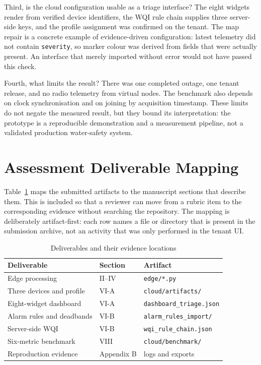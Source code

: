 \documentclass[conference]{IEEEtran}
\begin{document}
Third, is the cloud configuration usable as a triage interface? The eight
widgets render from verified device identifiers, the WQI rule chain supplies
three server-side keys, and the profile assignment was confirmed on the tenant.
The map repair is a concrete example of evidence-driven configuration: latest
telemetry did not contain \texttt{severity}, so marker colour was derived from
fields that were actually present. An interface that merely imported without
error would not have passed this check.

Fourth, what limits the result? There was one completed outage, one tenant
release, and no radio telemetry from virtual nodes. The benchmark also depends
on clock synchronisation and on joining by acquisition timestamp. These limits
do not negate the measured result, but they bound its interpretation: the
prototype is a reproducible demonstration and a measurement pipeline, not a
validated production water-safety system.

\section{Assessment Deliverable Mapping}
\label{sec:deliverables}

Table~\ref{tab:deliverables} maps the submitted artifacts to the manuscript
sections that describe them. This is included so that a reviewer can move from a
rubric item to the corresponding evidence without searching the repository. The
mapping is deliberately artifact-first: each row names a file or directory that
is present in the submission archive, not an activity that was only performed in
the tenant UI.

\begin{table}[t]
\caption{Deliverables and their evidence locations}
\label{tab:deliverables}
\centering
\scriptsize
\begin{tabular}{@{}lll@{}}
\toprule
Deliverable & Section & Artifact \\
\midrule
Edge processing & II--IV & \texttt{edge/*.py} \\
Three devices and profile & VI-A & \texttt{cloud/artifacts/} \\
Eight-widget dashboard & VI-A & \texttt{dashboard\_triage.json} \\
Alarm rules and deadbands & VI-B & \texttt{alarm\_rules\_import/} \\
Server-side WQI & VI-B & \texttt{wqi\_rule\_chain.json} \\
Six-metric benchmark & VIII & \texttt{cloud/benchmark/} \\
Reproduction evidence & Appendix B & logs and exports \\
\bottomrule
\end{tabular}
\end{table}
\end{document}
